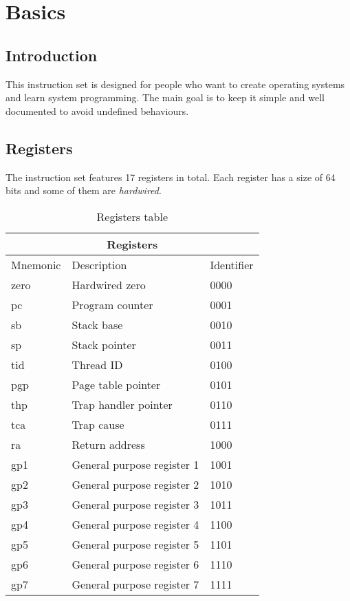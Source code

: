\documentclass{article}
\begin{document}
\section{Basics}
\subsection{Introduction}
This instruction set is designed for people who want to create operating systems and learn system programming. The main goal is to keep it simple and well documented to avoid undefined behaviours.

\subsection{Registers}
The instruction set features 17 registers in total. Each register has a size of 64 bits and some of them are \textit{hardwired}.
\begin{table}[h!]
\centering
\begin{tabular} { | p{3cm} | | p{6cm} | p{2cm} |}
  \hline
  \multicolumn{3}{|c|}{Registers}\\
  \hline
  Mnemonic & Description & Identifier\\
  \hline
  zero & Hardwired zero & 0000\\
  pc & Program counter & 0001\\
  sb & Stack base & 0010\\
  sp & Stack pointer & 0011\\
  tid & Thread ID & 0100\\
  pgp & Page table pointer & 0101\\
  thp & Trap handler pointer & 0110\\
  tca & Trap cause & 0111\\
  ra & Return address & 1000\\
  gp1 & General purpose register 1 & 1001\\
  gp2 & General purpose register 2 & 1010\\
  gp3 & General purpose register 3 & 1011\\
  gp4 & General purpose register 4 & 1100\\
  gp5 & General purpose register 5 & 1101\\
  gp6 & General purpose register 6 & 1110\\
  gp7 & General purpose register 7 & 1111\\
  \hline
\end{tabular}
\caption{Registers table}
\end{table}
\end{document}
